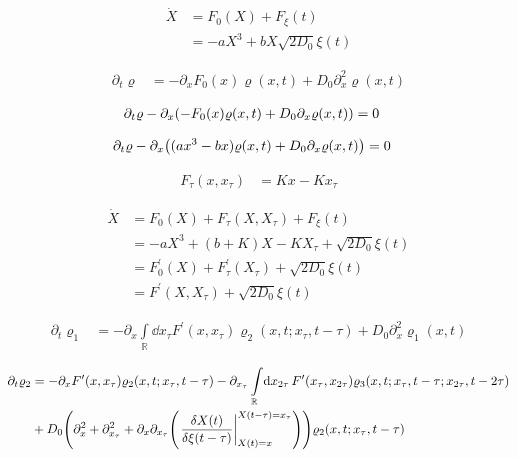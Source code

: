 \documentclass[a4paper,10pt]{article}
\newcommand{\intl}{\int\limits}
\begin{document}
\begin{align}
	\dot{X}
	&=
	F_0(X)
	+
	F_\xi(t)
\\
	&=
	-aX^3+bX
	\sqrt{2D_0}
	\xi(t)
\end{align}

\begin{align}
	\partial_t
	\varrho
	&=
	-
	\partial_x
	F_0(x)
	\varrho(x,t)
	+
	D_0
	\partial_x^2
	\varrho(x,t)
\end{align}

\begin{align}
	\partial_t
	\varrho
	-
	\partial_x
	\pqty{
		-
		F_0(x)
		\varrho(x,t)
		+
		D_0
		\partial_x
		\varrho(x,t)
	}
	&=
	0
\end{align}

\begin{align}
	\partial_t
	\varrho
	-
	\partial_x
	\pqty{
		(ax^3-bx)
		\varrho(x,t)
		+
		D_0
		\partial_x
		\varrho(x,t)
	}
	&=
	0
\end{align}

\begin{align}
	F_\tau
	(x,x_\tau)
	&=
	Kx
	-
	Kx_\tau
\end{align}

\begin{align}
	\dot{X}
	&=
	F_0(X)
	+
	F_\tau(X,X_\tau)
	+
	F_\xi(t)
	\\
	&=
	-aX^3
	+
	(b+K)
	X
	-
	KX_\tau
	+
	\sqrt{2D_0}
	\xi(t)
\\
	&=
	F_0^\prime(X)
	+
	F_\tau^\prime(X_\tau)
	+
	\sqrt{2D_0}
	\xi(t)
\\
	&=
	F^\prime(X,X_\tau)
	+
	\sqrt{2D_0}
	\xi(t)
\end{align}

\begin{align}
	\partial_t
	\varrho_1
	&=
	-
	\partial_x
	\intl_{\mathbb{R}}
	\dd{x_\tau}
	F^\prime(x,x_\tau)
	\varrho_2
	(x,t;x_\tau,t-\tau)
	+
	D_0
	\partial_x^2
	\varrho_1
	(x,t)
\end{align}

\begin{align}
	\partial_t
	\varrho_2
	&=
	-
	\partial_x
	F^\prime(x,x_\tau)
	\varrho_2
	(x,t;x_\tau,t-\tau)
	-
	\partial_{x_\tau}
	\intl_{\mathbb{R}}
	\!
	\dd{x_{2\tau}}
	F^\prime(x_\tau,x_{2\tau})
	\varrho_3
	(x,t;x_\tau,t-\tau;x_{2\tau},t-2\tau)
	\\
	&+
	D_0
	\pqty{
		\partial_x^2
		+
		\partial_{x_\tau}^2
		+
		\partial_x
		\partial_{x_\tau}
		\pqty{
			\eval{
				\frac{\delta X(t)}{\delta\xi(t-\tau)}
			}_{
				X(t)=x
			}^{
				X(t-\tau)=x_{\tau}
			}
		}
	}
	\varrho_2(x,t;x_\tau,t-\tau)
\end{align}
\end{document}
